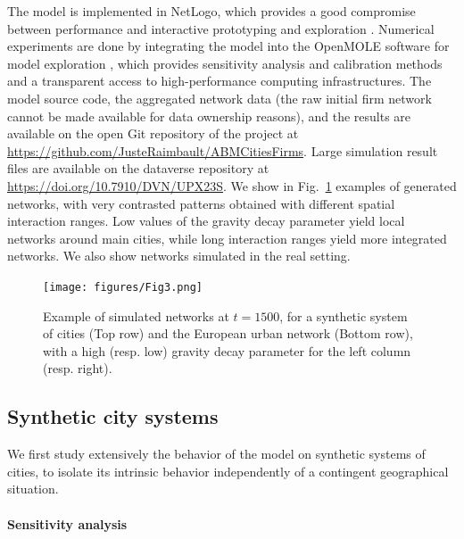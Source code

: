 \documentclass[10pt,letterpaper]{article}
\begin{document}
The model is implemented in NetLogo, which provides a good compromise between performance and interactive prototyping and exploration \cite{railsback2017improving}. Numerical experiments are done by integrating the model into the OpenMOLE software for model exploration \cite{reuillon2013openmole}, which provides sensitivity analysis and calibration methods and a transparent access to high-performance computing infrastructures. The model source code, the aggregated network data (the raw initial firm network cannot be made available for data ownership reasons), and the results are available on the open Git repository of the project at \url{https://github.com/JusteRaimbault/ABMCitiesFirms}. Large simulation result files are available on the dataverse repository at \url{https://doi.org/10.7910/DVN/UPX23S}. We show in Fig.~\ref{fig:fig3} examples of generated networks, with very contrasted patterns obtained with different spatial interaction ranges. Low values of the gravity decay parameter yield local networks around main cities, while long interaction ranges yield more integrated networks. We also show networks simulated in the real setting.

\begin{figure}
    \begin{center}
        \texttt{[image: figures/Fig3.png]}
    \end{center}
    \caption{Example of simulated networks at $t=1500$, for a synthetic system of cities (Top row) and the European urban network (Bottom row), with a high (resp. low) gravity decay parameter for the left column (resp. right).\label{fig:fig3}}
\end{figure}


\subsection*{Synthetic city systems}

We first study extensively the behavior of the model on synthetic systems of cities, to isolate its intrinsic behavior independently of a contingent geographical situation.

\paragraph{Sensitivity analysis}
\end{document}
